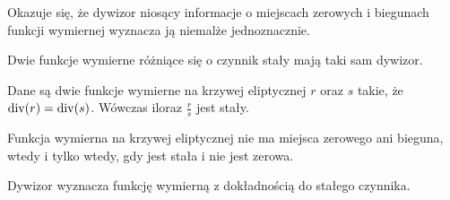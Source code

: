 Okazuje się, że dywizor niosący informacje o miejscach zerowych i biegunach
funkcji wymiernej wyznacza ją niemalże jednoznacznie.

\begin{fact}
Dwie funkcje wymierne różniące się o czynnik stały mają taki sam dywizor.
\end{fact}

\begin{theorem}
Dane są dwie funkcje wymierne na krzywej eliptycznej $r$ oraz $s$ takie,
że $\operatorname{div}(r) = \operatorname{div}(s)$.
Wówczas iloraz $\frac{r}{s}$ jest stały.
\end{theorem}

\begin{corollary}
Funkcja wymierna na krzywej eliptycznej nie ma miejsca zerowego ani bieguna,
wtedy i tylko wtedy, gdy jest stała i nie jest zerowa.
\end{corollary}

\begin{corollary}
Dywizor wyznacza funkcję wymierną z dokładnością do stałego czynnika.
\end{corollary}
